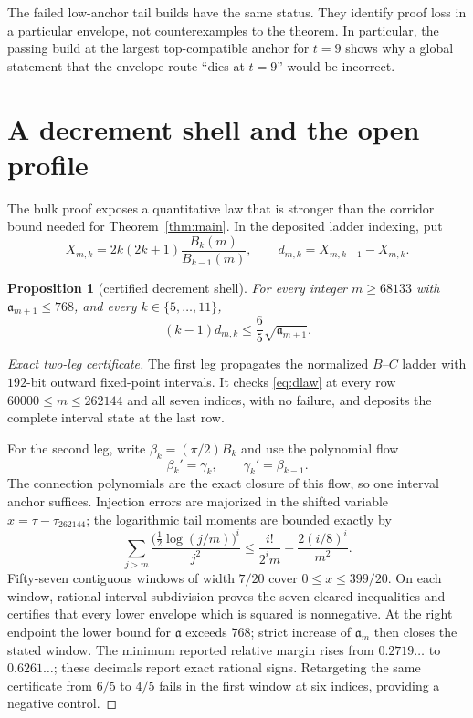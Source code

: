 \documentclass[11pt,a4paper]{article}
\theoremstyle{plain}
\newtheorem{proposition}[theorem]{Proposition}
\theoremstyle{remark}
\newcommand{\level}{\mathfrak a}
\begin{document}
The failed low-anchor tail builds have the same status.  They identify proof
loss in a particular envelope, not counterexamples to the theorem.  In
particular, the passing build at the largest top-compatible anchor for $t=9$
shows why a global statement that the envelope route ``dies at $t=9$'' would
be incorrect.

\section{A decrement shell and the open profile}\label{sec:open}

The bulk proof exposes a quantitative law that is stronger than the corridor
bound needed for Theorem~\ref{thm:main}.  In the deposited ladder indexing,
put
\[
 X_{m,k}=2k(2k+1)\frac{B_k(m)}{B_{k-1}(m)},
 \qquad d_{m,k}=X_{m,k-1}-X_{m,k}.
\]

\begin{proposition}[certified decrement shell]\label{prop:dlaw}
For every integer $m\ge68133$ with $\level_{m+1}\le768$, and every
$k\in\{5,\ldots,11\}$,
\begin{equation}\label{eq:dlaw}
 (k-1)d_{m,k}\le\frac65\sqrt{\level_{m+1}}.
\end{equation}
\end{proposition}

\begin{proof}[Exact two-leg certificate]
The first leg propagates the normalized $B$--$C$ ladder with
$192$-bit outward fixed-point intervals.  It checks
\eqref{eq:dlaw} at every row $60000\le m\le262144$ and all seven indices,
with no failure, and deposits the complete interval state at the last row.

For the second leg, write $\beta_k=(\pi/2)B_k$ and use the polynomial flow
\[
 \beta_k'=\gamma_k,\qquad \gamma_k'=\beta_{k-1}.
\]
The connection polynomials are the exact closure of this flow, so one
interval anchor suffices.  Injection errors are majorized in the shifted
variable $x=\tau-\tau_{262144}$; the logarithmic tail moments are bounded
exactly by
\[
 \sum_{j>m}\frac{\bigl(\tfrac12\log(j/m)\bigr)^i}{j^2}
 \le \frac{i!}{2^i m}+\frac{2(i/8)^i}{m^2}.
\]
Fifty-seven contiguous windows of width $7/20$ cover
$0\le x\le399/20$.  On each window, rational interval subdivision proves
the seven cleared inequalities and certifies that every lower envelope
which is squared is nonnegative.  At the right endpoint the lower bound for
$\level$ exceeds $768$; strict increase of $\level_m$ then closes the stated
window.  The minimum reported relative margin rises from
$0.2719\ldots$ to $0.6261\ldots$; these decimals report exact rational
signs.  Retargeting the same certificate from $6/5$ to $4/5$ fails in the
first window at six indices, providing a negative control.
\end{proof}
\end{document}
